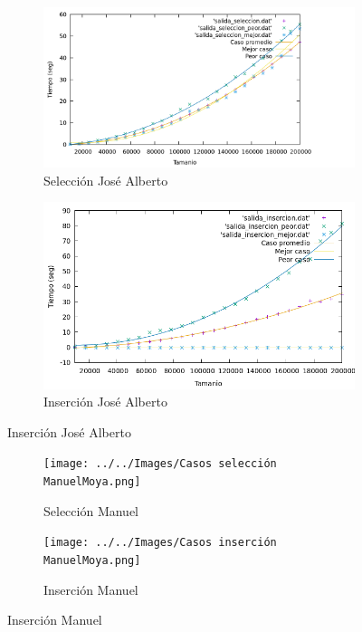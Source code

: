 \documentclass[10pt,a4paper]{article}
\begin{document}
\begin{figure}[h!]
	\begin{subfigure}{.5\textwidth}
		\centering
		\includegraphics[scale=0.12]{../../Images/Gráfica casos selección Joshoccas.png}
		\caption{Selección José Alberto}
	\end{subfigure}
	\hfill
	\begin{subfigure}{.5\textwidth}
		\centering
		\includegraphics[scale=0.3]{../../Images/Gráfica casos inserción Joshoccas.png}
		\caption{Inserción José Alberto}
	\end{subfigure}
\end{figure}

\begin{figure}[h!]
	\begin{subfigure}{.5\textwidth}
		\centering
		\texttt{[image: ../../Images/Casos selección ManuelMoya.png]}
		\caption{Selección Manuel}
	\end{subfigure}
	\hfill
	\begin{subfigure}{.5\textwidth}
		\centering
		\texttt{[image: ../../Images/Casos inserción ManuelMoya.png]}
		\caption{Inserción Manuel}
	\end{subfigure}
\end{figure}
\end{document}
